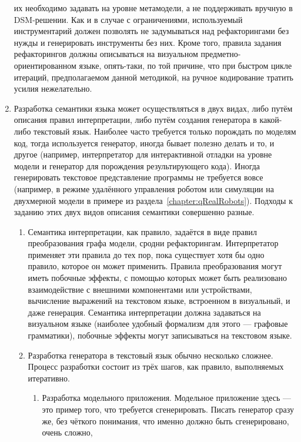 \begin{enumerate}
		их необходимо задавать на уровне метамодели, а не поддерживать вручную в \ac{DSM}-решении. 
		Как и в случае с ограничениями, используемый инструментарий должен позволять не 
		задумываться над рефакторингами без нужды и генерировать инструменты без них. Кроме 
		того, правила задания рефакторингов должны описываться на визуальном предметно-ориентированном 
		языке, опять-таки, по той причине, что при быстром цикле итераций, предполагаемом 
		данной методикой, на ручное кодирование тратить усилия нежелательно.
	\item Разработка семантики языка может осуществляться в двух видах, либо путём описания 
		правил интерпретации, либо путём создания генератора в какой-либо текстовый язык. 
		Наиболее часто требуется только порождать по моделям код, тогда используется 
		генератор, иногда бывает полезно делать и то, и другое (например, интерпретатор 
		для интерактивной отладки на уровне модели и генератор для порождения результирующего 
		кода). Иногда генерировать текстовое представление программы не требуется вовсе 
		(например, в режиме удалённого управления роботом или симуляции на двухмерной 
		модели в примере из раздела~\ref{chapter:qRealRobots}). Подходы к заданию этих 
		двух видов описания семантики совершенно разные.
		\begin{enumerate}
			\item Семантика интерпретации, как правило, задаётся в виде правил преобразования 
				графа модели, сродни рефакторингам. Интерпретатор применяет эти правила до 
				тех пор, пока существует хотя бы одно правило, которое он может применить. 
				Правила преобразования могут иметь побочные эффекты, с помощью которых может 
				быть реализовано взаимодействие с внешними компонентами или устройствами, 
				вычисление выражений на текстовом языке, встроенном в визуальный, и даже генерация. 
				Семантика интерпретации должна задаваться на визуальном языке (наиболее удобный 
				формализм для этого --- графовые грамматики),%
				побочные эффекты могут записываться на текстовом языке.
			\item Разработка генератора в текстовый язык обычно несколько сложнее. Процесс 
				разработки состоит из трёх шагов, как правило, выполняемых итеративно.
				\begin{enumerate}
					\item Разработка модельного приложения. Модельное приложение здесь --- это 
						пример того, что требуется сгенерировать. Писать генератор сразу же, без 
						чёткого понимания, что именно должно быть сгенерировано, очень сложно, 

\end{enumerate}
\end{enumerate}
\end{enumerate}
